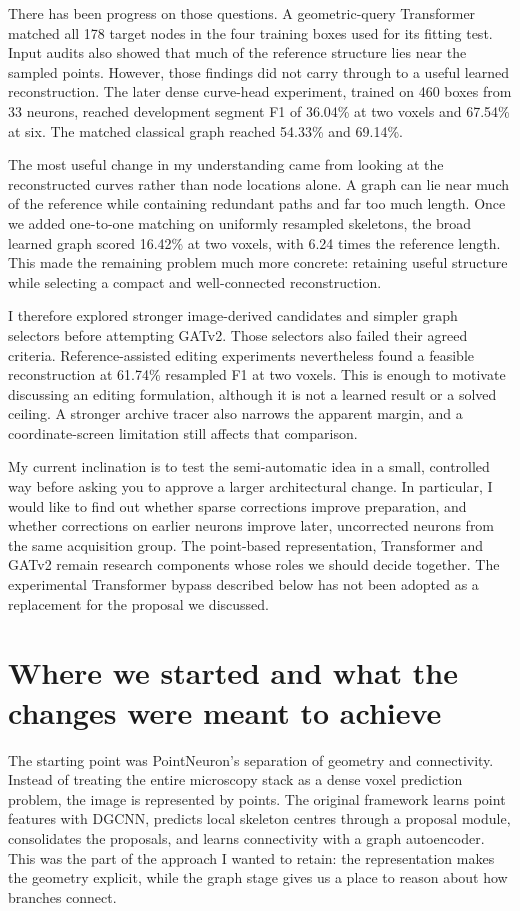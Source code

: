 \documentclass[11pt,a4paper]{article}
\newcommand{\evidence}[1]{~\cite{#1}}
\begin{document}
There has been progress on those questions. A geometric-query Transformer matched all 178 target nodes in the four training boxes used for its fitting test. Input audits also showed that much of the reference structure lies near the sampled points. However, those findings did not carry through to a useful learned reconstruction. The later dense curve-head experiment, trained on 460 boxes from 33 neurons, reached development segment F1 of 36.04\% at two voxels and 67.54\% at six. The matched classical graph reached 54.33\% and 69.14\%.\evidence{transformer,support,broad}

The most useful change in my understanding came from looking at the reconstructed curves rather than node locations alone. A graph can lie near much of the reference while containing redundant paths and far too much length. Once we added one-to-one matching on uniformly resampled skeletons, the broad learned graph scored 16.42\% at two voxels, with 6.24 times the reference length. This made the remaining problem much more concrete: retaining useful structure while selecting a compact and well-connected reconstruction.\evidence{compact}

I therefore explored stronger image-derived candidates and simpler graph selectors before attempting GATv2. Those selectors also failed their agreed criteria. Reference-assisted editing experiments nevertheless found a feasible reconstruction at 61.74\% resampled F1 at two voxels. This is enough to motivate discussing an editing formulation, although it is not a learned result or a solved ceiling. A stronger archive tracer also narrows the apparent margin, and a coordinate-screen limitation still affects that comparison.\evidence{trees,post,benchmark}

My current inclination is to test the semi-automatic idea in a small, controlled way before asking you to approve a larger architectural change. In particular, I would like to find out whether sparse corrections improve preparation, and whether corrections on earlier neurons improve later, uncorrected neurons from the same acquisition group. The point-based representation, Transformer and GATv2 remain research components whose roles we should decide together. The experimental Transformer bypass described below has not been adopted as a replacement for the proposal we discussed.

\clearpage
\tableofcontents
\clearpage

\section{Where we started and what the changes were meant to achieve}
The starting point was PointNeuron's separation of geometry and connectivity. Instead of treating the entire microscopy stack as a dense voxel prediction problem, the image is represented by points. The original framework learns point features with DGCNN, predicts local skeleton centres through a proposal module, consolidates the proposals, and learns connectivity with a graph autoencoder. This was the part of the approach I wanted to retain: the representation makes the geometry explicit, while the graph stage gives us a place to reason about how branches connect.\evidence{pointneuron}
\end{document}
